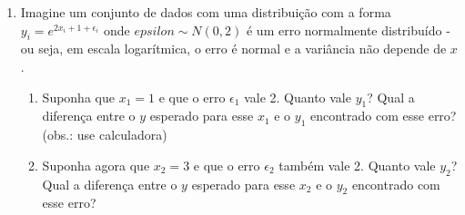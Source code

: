 \documentclass{article}
\begin{document}
\begin{enumerate}
	\item Imagine um conjunto de dados com uma distribuição com a forma $y_i =
		e^{2x_i+1+\epsilon_i}$ onde $epsilon \sim N(0,2)$ é um erro normalmente distribuído - ou seja,
		em escala logarítmica, o erro é normal e a variância não depende de $x$.
		\begin{enumerate}
			\item Suponha que $x_1=1$ e que o erro $\epsilon_1$ vale 2. Quanto vale
				$y_1$? Qual a diferença entre o $y$ esperado para esse $x_1$ e o
				$y_1$ encontrado com esse erro? (obs.: use calculadora)
			\item Suponha agora que $x_2=3$ e que o erro $\epsilon_2$ também vale 2. Quanto vale
				$y_2$? Qual a diferença entre o $y$ esperado para esse $x_2$ e o
				$y_2$ encontrado com esse erro?
		\end{enumerate}

\end{enumerate}
	
\end{document}
